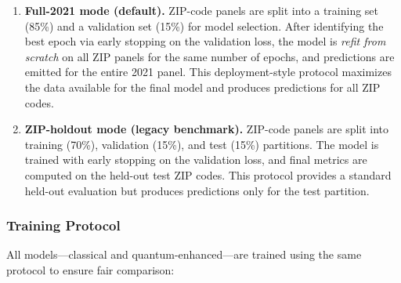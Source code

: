 \documentclass[11pt]{article}
\begin{document}
\begin{enumerate}
  \item \textbf{Full-2021 mode (default).} ZIP-code panels are split into a training set (85\%) and a validation set (15\%) for model selection. After identifying the best epoch via early stopping on the validation loss, the model is \emph{refit from scratch} on all ZIP panels for the same number of epochs, and predictions are emitted for the entire 2021 panel. This deployment-style protocol maximizes the data available for the final model and produces predictions for all ZIP codes.

  \item \textbf{ZIP-holdout mode (legacy benchmark).} ZIP-code panels are split into training (70\%), validation (15\%), and test (15\%) partitions. The model is trained with early stopping on the validation loss, and final metrics are computed on the held-out test ZIP codes. This protocol provides a standard held-out evaluation but produces predictions only for the test partition.
\end{enumerate}

\subsubsection*{Training Protocol}

All models---classical and quantum-enhanced---are trained using the same protocol to ensure fair comparison:
\end{document}
